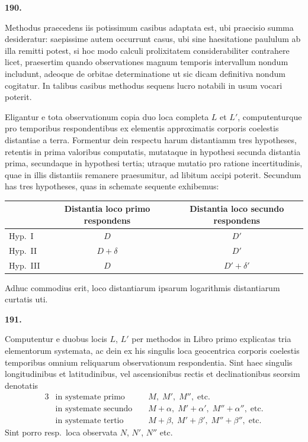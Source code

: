 \documentclass[11pt,a4paper]{article}
\begin{document}
\vspace{1em}

\noindent\textbf{190.}

Methodus praecedens iis potissimum casibus adaptata est, ubi praecisio summa desideratur: saepissime autem occurrunt casus, ubi sine haesitatione paululum ab illa remitti potest, si hoc modo calculi prolixitatem considerabiliter contrahere licet, praesertim quando observationes magnum temporis intervallum nondum includunt, adeoque de orbitae determinatione ut sic dicam definitiva nondum cogitatur. In talibus casibus methodus sequens lucro notabili in usum vocari poterit.

Eligantur e tota observationum copia duo loca completa $L$ et $L'$, computenturque pro temporibus respondentibus ex elementis approximatis corporis coelestis distantiae a terra. Formentur dein respectu harum distantiamm tres hypotheses, retentis in prima valoribus computatis, mutataque in hypothesi secunda distantia prima, secundaque in hypothesi tertia; utraque mutatio pro ratione incertitudinis, quae in illis distantiis remanere praesumitur, ad libitum accipi poterit. Secundum has tres hypotheses, quas in schemate sequente exhibemus:

\begin{center}
\begin{tabular}{lcc}
 & Distantia loco primo respondens & Distantia loco secundo respondens \\
\midrule
Hyp.\ I & $D$ & $D'$ \\
Hyp.\ II & $D + \delta$ & $D'$ \\
Hyp.\ III & $D$ & $D' + \delta'$
\end{tabular}
\end{center}

\noindent Adhuc commodius erit, loco distantiarum ipsarum logarithmis distantiarum curtatis uti.

\newpage
\setcounter{page}{261}

\noindent\textbf{191.}

Computentur e duobus locis $L$, $L'$ per methodos in Libro primo explicatas tria elementorum systemata, ac dein ex his singulis loca geocentrica corporis coelestis temporibus omnium reliquarum observationum respondentia. Sint haec singulis longitudinibus et latitudinibus, vel ascensionibus rectis et declinationibus seorsim denotatis
\begin{alignat*}{3}
&\text{in systemate primo } && M,\; M',\; M'',\; \text{etc.} \\
&\text{in systemate secundo } && M+\alpha,\; M'+\alpha',\; M''+\alpha'',\; \text{etc.} \\
&\text{in systemate tertio } && M+\beta,\; M'+\beta',\; M''+\beta'',\; \text{etc.}
\end{alignat*}
Sint porro resp.\ loca observata $N$, $N'$, $N''$ etc.
\end{document}
